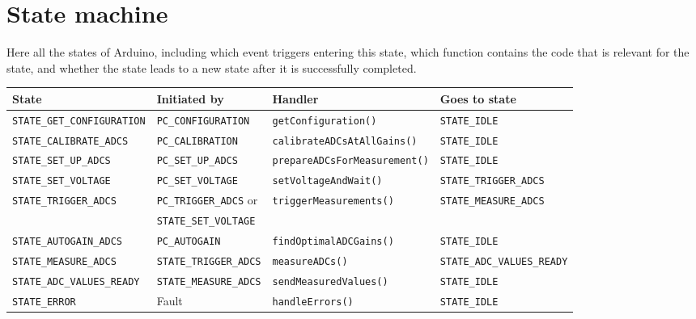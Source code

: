\documentclass[11pt,a4paper,english]{article}
\begin{document}
\clearpage

\section{State machine}\label{sec:state_machine}
Here all the states of Arduino, including which event triggers entering this state, which function contains the code that is relevant for the state, and whether the state leads to a new state after it is successfully completed.
\begin{center}
\small
\begin{tabular}{llll}\toprule
State					        & Initiated by                 & Handler                            & Goes to state        \\\midrule
\texttt{STATE\_GET\_CONFIGURATION} & \texttt{PC\_CONFIGURATION}    & \texttt{getConfiguration()}    & \texttt{STATE\_IDLE}\\
\texttt{STATE\_CALIBRATE\_ADCS} & \texttt{PC\_CALIBRATION}     & \texttt{calibrateADCsAtAllGains()} & \texttt{STATE\_IDLE}\\
\texttt{STATE\_SET\_UP\_ADCS}   & \texttt{PC\_SET\_UP\_ADCS}   & \texttt{prepareADCsForMeasurement()} & \texttt{STATE\_IDLE} \\
\texttt{STATE\_SET\_VOLTAGE}    & \texttt{PC\_SET\_VOLTAGE}    & \texttt{setVoltageAndWait()}       & \texttt{STATE\_TRIGGER\_ADCS}\\
\texttt{STATE\_TRIGGER\_ADCS}   & \texttt{PC\_TRIGGER\_ADCS} or & \texttt{triggerMeasurements()} & \texttt{STATE\_MEASURE\_ADCS} \\
                                & \texttt{STATE\_SET\_VOLTAGE} &&\\
\texttt{STATE\_AUTOGAIN\_ADCS}  & \texttt{PC\_AUTOGAIN}        & \texttt{findOptimalADCGains()}     & \texttt{STATE\_IDLE} \\
\texttt{STATE\_MEASURE\_ADCS}   & \texttt{STATE\_TRIGGER\_ADCS} & \texttt{measureADCs()}   & \texttt{STATE\_ADC\_VALUES\_READY}\\
\texttt{STATE\_ADC\_VALUES\_READY} & \texttt{STATE\_MEASURE\_ADCS} & \texttt{sendMeasuredValues()}  & \texttt{STATE\_IDLE}\\
\texttt{STATE\_ERROR}           & Fault                        & \texttt{handleErrors()}            & \texttt{STATE\_IDLE}\\
\bottomrule
\end{tabular}
\end{center}
\end{document}
